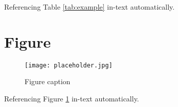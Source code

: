 Referencing Table \ref{tab:example} in-text automatically.


\section{Figure}

\begin{figure}[h]
	\centering\texttt{[image: placeholder.jpg]}
	\caption{Figure caption}
	\label{fig:placeholder} %
\end{figure}

Referencing Figure \ref{fig:placeholder} in-text automatically.

